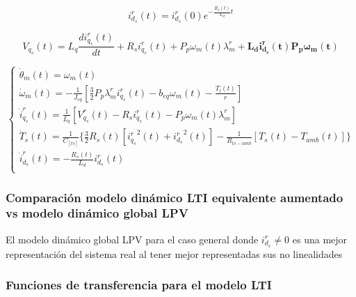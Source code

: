 \documentclass{article}
\begin{document}
\begin{enumerate}[label=\roman*.]
    \begin{equation}
        i_{d_{s}}^r(t) = i_{d_{s}}^r(0)e^{-\frac{R_{s}(t)}{L_{d}}t}
    \end{equation}

    \begin{equation}
        V_{q_{s}}(t) = L_{q}\frac{di_{q_{s}}^r(t)}{dt} + R_{s}i_{q_{s}}^r(t) + P_{p}\omega_{m}(t)\lambda_{m}^r + \mathbf{L_{d}i_{d_{s}}^r(t)P_{p}\omega_{m}(t)}
    \end{equation}

    \begin{equation}
        \begin{cases}
            \dot{\theta}_{m}(t) = \omega_{m}(t)\\
            \dot{\omega}_{m}(t) = -\frac{1}{J_{eq}}[\frac{3}{2}P_{p}\lambda_{m}^r i_{q_{s}}^r(t) - b_{eq}\omega_{m}(t)-\frac{T_{l}(t)}{r}]\\
            \dot{i}_{q_{s}}^r(t) = \frac{1}{L_{q}}[V_{q_{s}}^r(t) - R_{s}i_{q_{s}}^r(t) - P_{p}\omega_{m}(t)\lambda_{m}^r]\\
            \dot{T}_{s}(t) = \frac{1}{C_[ts]}\{\frac{3}{2}R_{s}(t)[{i_{q_{s}}^r}^2(t) + {i_{d_{s}}^r}^2(t)] - \frac{1}{R_{ts-amb}}[T_{s}(t) - T_{amb}(t)]\}\\
            \dot{i}_{d_{s}}^r(t) = -\frac{R_{s}(t)}{L_{d}}i_{d_{s}}^r(t) \\
        \end{cases}    
    \end{equation}

\end{enumerate}


\subsubsection*{Comparación modelo dinámico LTI equivalente aumentado vs modelo dinámico global LPV}

El modelo dinámico global LPV para el caso general donde $i_{d_{s}}^r \neq 0$
es una mejor representación del sistema real al tener mejor representadas sus 
no linealidades


\subsubsection*{Funciones de transferencia para el modelo LTI}
\end{document}
